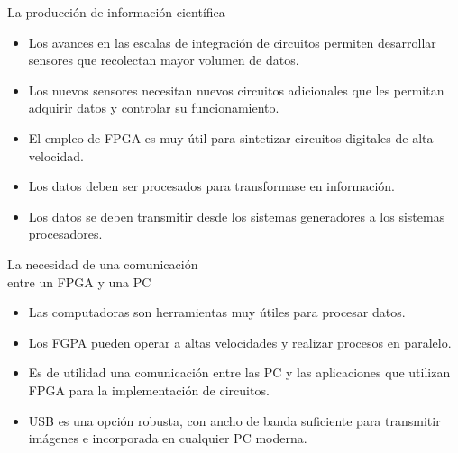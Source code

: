 \begin{frame}{La producción de información científica}
	\begin{itemize}
		\item Los avances en las escalas de integración de circuitos permiten desarrollar sensores que recolectan mayor volumen de datos.
		\item Los nuevos sensores necesitan nuevos circuitos adicionales que les permitan adquirir datos y controlar su funcionamiento.
		\item El empleo de FPGA es muy útil para sintetizar circuitos digitales de alta velocidad.
		\item Los datos deben ser procesados para transformase en información.
		\item Los datos se deben transmitir desde los sistemas generadores a los sistemas procesadores.
	\end{itemize}
\end{frame}
\begin{frame}{La necesidad de una comunicación\\entre un FPGA y una PC}
	\begin{itemize}
		\item Las computadoras son herramientas muy útiles para procesar datos.
		\item Los FGPA pueden operar a altas velocidades y realizar procesos en paralelo.
		\item Es de utilidad una comunicación entre las PC y las aplicaciones que utilizan FPGA para la implementación de circuitos.
		\item USB es una opción robusta, con ancho de banda suficiente para transmitir imágenes e incorporada en cualquier PC moderna.
	\end{itemize}
\end{frame}